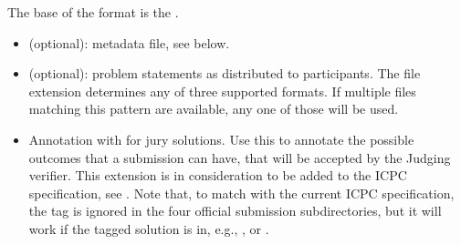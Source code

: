 \documentclass[a4paper,10pt,english,openany]{sphinxmanual}
\begin{document}
\sphinxAtStartPar
The base of the format is the .
\begin{description}
\begin{itemize}
\item {} 
\sphinxAtStartPar
{} (optional): metadata file, see below.

\item {} 
\sphinxAtStartPar
{} (optional): problem statements as
distributed to participants. The file extension determines any of
three supported formats. If multiple files matching this pattern are
available, any one of those will be used.

\item {} 
\sphinxAtStartPar
Annotation with  for jury solutions.
Use this to annotate the possible outcomes that a submission can have,
that will be accepted by the Judging verifier.
This extension is in consideration to be added to the ICPC specification,
see .
Note that, to match with the current ICPC specification,
the  tag is ignored in
the four official submission subdirectories,
but it will work if the tagged solution is in, e.g.,
,  or .
\def\sphinxLiteralBlockLabel{\label{\detokenize{problem-format:id1}}}
\begin{sphinxVerbatim}[commandchars=\\\{\}]


  

\end{sphinxVerbatim}

\end{itemize}

\end{description}
\end{document}

